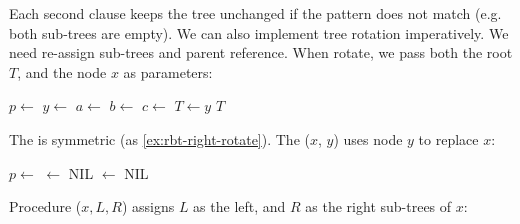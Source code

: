\documentclass[b5paper]{article}
\begin{document}
\be
{}
\ee

Each second clause keeps the tree unchanged if the pattern does not match (e.g. both sub-trees are empty). We can also implement tree rotation imperatively. We need re-assign sub-trees and parent reference. When rotate, we pass both the root $T$, and the node $x$ as parameters:

\begin{algorithmic}[1]
  \State $p \gets$ 
  \State $y \gets$  
  \State $a \gets$ 
  \State $b \gets$ 
  \State $c \gets$ 
  \State {}  
  \State {} 
  \State {} 
    
    \State $T \gets y$
  \EndIf
  \State \Return $T$
\EndFunction
\end{algorithmic}

The  is symmetric (as \cref{ex:rbt-right-rotate}). The ($x$, $y$) uses node $y$ to replace $x$:

\begin{algorithmic}[1]
  \State $p \gets$ 
   
            $\gets$ NIL
    \EndIf
    \State {}
  \Else
    \State {}
  \EndIf
  \State {} $\gets$ NIL
\EndFunction
\end{algorithmic}

Procedure ($x, L, R$) assigns $L$ as the left, and $R$ as the right sub-trees of $x$:
\end{document}
